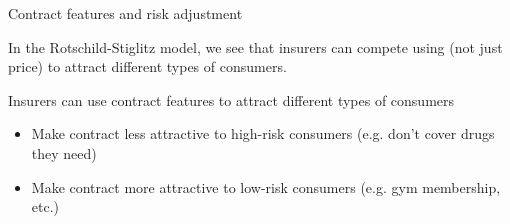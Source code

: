 \begin{frame}{Contract features and risk adjustment}
\hypertarget{creamskimming}{}

    In the Rotschild-Stiglitz model,
    we see that insurers can compete using  (not just price) to attract different types of consumers.\\
    \hyperlink{RS:nopooling}{}
    \vspace{3mm}

    Insurers can use contract features to attract different types of consumers
    \begin{itemize}
        \item Make contract less attractive to high-risk consumers (e.g. don't cover drugs they need)
        \item Make contract more attractive to low-risk consumers (e.g. gym membership, etc.)
    \end{itemize}
    \vspace{3mm}


\end{frame}
